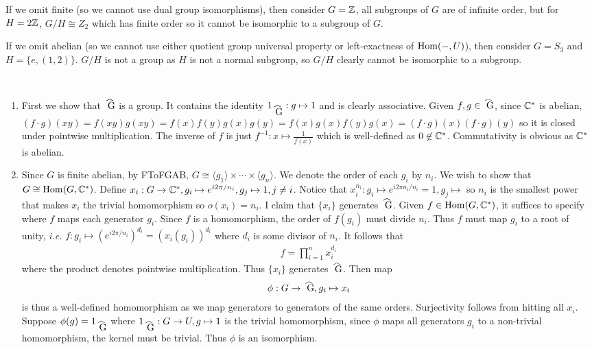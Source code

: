 \documentclass[12pt]{article}
\begin{document}
\begin{problem}[4]
If we omit finite (so we cannot use dual group isomorphisms), then consider $ G = \mathbb{Z}$, all subgroups of $ G$ are of infinite order, but for $H = 2\mathbb{Z} $, $ G /H \cong Z_2$ which has finite order so it cannot be isomorphic to a subgroup of $ G$.

If we omit abelian (so we cannot use either quotient group universal property or left-exactness of $ \operatorname{Hom}( -, U)$), then consider  $ G= S_3$ and $ H = \{e,(1,2)\} $. $ G /H$ is not a group as  $ H$ is not a normal subgroup, so  $ G /H$ clearly cannot be isomorphic to a subgroup.
\end{problem}
\begin{problem}[5]
~\begin{enumerate}[label=(\alph*)]
	\item First we show that $ \wh{ G}$ is a group. It contains the identity $ 1_{\wh{ G}}: g \mapsto 1$ and is clearly associative. Given $ f,g \in \wh{ G}$, since $ \mathbb{C}^* $ is abelian, $ (f \cdot g)(xy) = f(xy)g(xy) = f(x)f(y)g(x)g(y) = f(x)g(x)f(y)g(x) = (f \cdot g)(x) (f \cdot g)(y)$ so it is closed under pointwise multiplication. The inverse of $ f$ is just  $ f^{-1} : x \mapsto \frac{1}{f(x)}$ which is well-defined as $ 0 \not\in \mathbb{C}^* $. Commutativity is obvious as $ \mathbb{C}^* $ is abelian.
	\item Since $ G$ is finite abelian, by FToFGAB, $ G \cong \langle g_1 \rangle \times \cdots \times \langle g_n \rangle $. We denote the order of each $ g_i$ by $ n_i$. We wish to show that $G \cong \operatorname{Hom}(G, \mathbb{C}^* )$. Define $ x_i: G \to \mathbb{C}^*, g_i \mapsto e^{i2\pi / n_i}, g_j \mapsto 1,j\neq i$. Notice that $ x_i^{n_i}: g_i \mapsto e^{i2\pi n_i /n_i} = 1, g_j \mapsto $ so $ n_i$ is the smallest power that makes $ x_i$ the trivial homomorphism so $ o(x_i) = n_i$. I claim that $ \{x_i\} $ generates $ \wh{ G}$. Given $ f \in \operatorname{Hom}(G, \mathbb{C}^* )$, it suffices to specify where $ f$ maps each generator  $ g_i$. Since $ f$ is a homomorphism, the order of  $ f(g_i)$ must divide $ n_i$. Thus $ f$ must map  $ g_i$ to a root of unity, \emph{i.e.}  $ f: g_i \mapsto ( e^{i2 \pi /n_i})^{d_i} = (x_i(g_i))^{d_i}$ where $ d_i$ is some divisor of  $ n_i$. It follows that
		\begin{align*}
			f = \prod_{ i= 1}^{ n}  x_i^{d_i} 
		\end{align*}
where the product denotes pointwise multiplication. Thus $ \{x_i\} $ generates $ \wh{ G}$. Then map
\begin{align*}
	\phi: G \to \wh{ G}, g_i \mapsto x_i
\end{align*}
is thus a well-defined homomorphism as we map generators to generators of the same orders. Surjectivity follows from hitting all $ x_i$. Suppose $ \phi(g) = 1_{\wh{ G}}$ where $ 1_{\wh{ G}}: G \to U, g \mapsto 1$ is the trivial homomorphism, since $ \phi$ maps all generators $ g_i$ to a non-trivial homomorphism, the kernel must be trivial. Thus $ \phi$ is an isomorphism.
\end{enumerate}
\end{problem}
\end{document}
